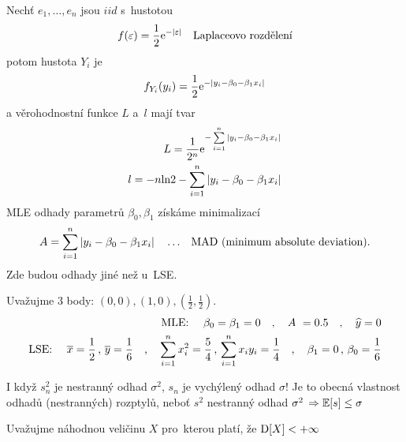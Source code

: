 \begin{example}
Nechť $ e_{1}, \dots , e_{n} $ jsou $iid$ s~hustotou
\begin{equation*}
  f(\varepsilon) = \frac{1}{2} \mathrm{e}^{- \vert \varepsilon \vert} \quad \text{Laplaceovo rozdělení}
\end{equation*}
potom hustota $ Y_{i} $ je 
\begin{equation*}
  f_{Y_{i}}(y_{i}) = \frac{1}{2} \mathrm{e}^{- \vert y_{i} - \beta_{0} - \beta_{1} x_{i} \vert} 
\end{equation*}
a věrohodnostní funkce $ L $ a~$  l$ mají tvar
\begin{equation*}
\begin{aligned}
  L = \frac{1}{2^{n}} \mathrm{e}^{- \sum\limits_{i=1}^{n} \vert y_{i} - \beta_{0} - \beta_{1} x_{i} \vert}  \\
  l = -n \text{ln} 2 - \sum\limits_{i=1}^{n} \vert y_{i} - \beta_{0} - \beta_{1} x_{i} \vert 
\end{aligned} 
\end{equation*}
MLE odhady parametrů $ \beta_{0} , \beta_{1} $ získáme minimalizací
$$
A = \sum\limits_{i=1}^{n} \vert y_{i} - \beta_{0} - \beta_{1} x_{i} \vert \quad \dots \text{ \, MAD (minimum absolute deviation).}
$$
Zde budou odhady jiné než u~LSE.

Uvažujme 3 body: $ (0,0) , (1,0) , (\frac{1}{2},\frac{1}{2}) $.
$$
\begin{aligned}
\text{MLE: } \quad  \beta_{0} = \beta_{1} = 0 \quad , \quad A~= 0.5
 \quad , \quad \widehat{y} = 0 \\
 \text{LSE: } \quad \overline{x} = \frac{1}{2} \, , \, \overline{y} = \frac{1}{6} \quad , \quad \sum\limits_{i=1}^{n} x_{i}^{2} = \frac{5}{4} \, , \, \sum\limits_{i=1}^{n} x_{i} y_{i} = \frac{1}{4} \quad , \quad \beta_{1} = 0 \, , \, \beta_{0} = \frac{1}{6}
  \end{aligned}  
$$
\end{example}

\begin{remark}
I když $ s^{2}_{n} $ je nestranný odhad $ \sigma^{2} $, $ s_{n} $ je vychýlený odhad $ \sigma $!
Je to obecná vlastnost odhadů (nestranných) rozptylů, neboť $ s^{2} $ nestranný odhad $ \sigma^{2} \, \Rightarrow \mathbb{E}[s] \leq \sigma $ 
\end{remark}

Uvažujme náhodnou veličinu $ X $  pro~kterou platí, že $ \mathrm{D} [ X ] < + \infty $





